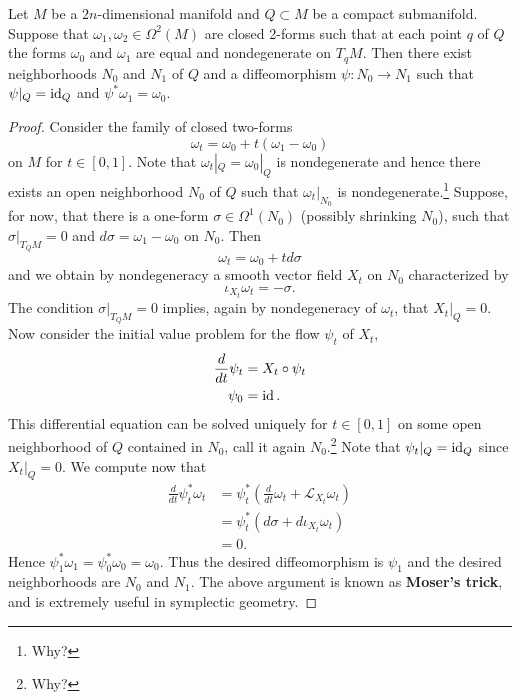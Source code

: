 \documentclass{amsart}
\begin{document}
\begin{theorem}
    Let $M$ be a $2n$-dimensional manifold and $Q\subset M$ be a compact submanifold. Suppose that
    $\omega_1,\omega_2\in\Omega^2(M)$ are closed 2-forms such that at each point $q$ of $Q$ the forms
    $\omega_0$ and $\omega_1$ are equal and nondegenerate on $T_qM$. Then there exist neighborhoods
    $N_0$ and $N_1$ of $Q$ and a diffeomorphism $\psi:N_0\to N_1$ such that $\psi|_Q=\operatorname{id}_Q$ and
    $\psi^*\omega_1=\omega_0$.
    \label{thm:moser}
\end{theorem}
\begin{proof}
    Consider the family of closed two-forms
    \begin{equation*}
        \omega_t = \omega_0 + t(\omega_1-\omega_0)
    \end{equation*}
    on $M$ for $t\in[0,1]$. Note that $\omega_t|_Q=\omega_0|_Q$ is nondegenerate and hence there exists
    an open neighborhood $N_0$ of $Q$ such that $\omega_t|_{N_0}$ is nondegenerate.\footnote{Why?} Suppose,
    for now, that there is a one-form $\sigma\in\Omega^1(N_0)$ (possibly shrinking $N_0$), such that
    $\sigma|_{T_QM}=0$ and $d\sigma=\omega_1-\omega_0$ on $N_0$. Then
    \begin{equation*}
        \omega_t = \omega_0+td\sigma
    \end{equation*}
    and we obtain by nondegeneracy a smooth vector field $X_t$ on $N_0$ characterized by
    \begin{equation*}
        \iota_{X_t}\omega_t = -\sigma.
    \end{equation*}
    The condition $\sigma|_{T_QM}=0$ implies, again by nondegeneracy of $\omega_t$, that $X_t|_Q=0$.
    Now consider the initial value problem for the flow $\psi_t$ of $X_t$,
    \begin{align*}
        \frac{d}{dt}\psi_t &= X_t \circ \psi_t\\
        \psi_0 &= \operatorname{id}.
    \end{align*}
    This differential equation can be solved uniquely for $t\in[0,1]$ on some open neighborhood of
    $Q$ contained in $N_0$, call it again $N_0$.\footnote{Why?} Note that $\psi_t|_Q=\operatorname{id}_Q$ since $X_t|_Q=0$.
    We compute now that
    \begin{align*}
        \frac{d}{dt}\psi_t^*\omega_t &= \psi_t^*\left( \frac{d}{dt}\omega_t + \mathcal{L}_{X_t}\omega_t \right)\\
        &= \psi_t^*\left( d\sigma + d\iota_{X_t}\omega_t\right)\\
        &= 0.
    \end{align*}
    Hence $\psi_1^*\omega_1=\psi_0^*\omega_0=\omega_0$. Thus the desired diffeomorphism is
    $\psi_1$ and the desired neighborhoods are $N_0$ and $N_1$.
    The above argument is known as \textbf{Moser's trick}, and is extremely useful in symplectic
    geometry.
    

\end{proof}
\end{document}
